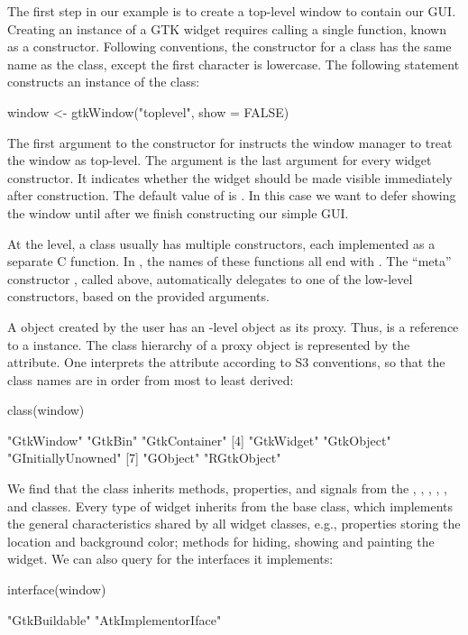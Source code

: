 The first step in our example is to create a top-level window to
contain our GUI.  Creating an instance of a GTK\/ widget requires
calling a single \R\/ function, known as a constructor. Following \R\/
conventions, the constructor for a class has the same name as the
class, except the first character is lowercase. The following
statement constructs an instance of the  class:
\begin{Schunk}
\begin{Sinput}
 window <- gtkWindow("toplevel", show = FALSE)
\end{Sinput}
\end{Schunk}
%
The first argument to the constructor for  instructs
the window manager to treat the window as top-level.  The 
argument is the last argument for every widget constructor. It
indicates whether the widget should be made visible immediately after
construction.  The default value of  is . In
this case we want to defer showing the window until after we finish
constructing our simple GUI.

At the \GTK\/ level, a class usually has multiple constructors, each
implemented as a separate C function. In , the names of
these functions all end with . The ``meta'' constructor
, called above, automatically delegates to one of
the low-level constructors, based on the provided arguments.

A \GTK\/ object created by the \R\/ user has an \R-level object as its
proxy. Thus,  is a reference to a 
instance.  The class hierarchy of a proxy object is represented by the
 attribute. One interprets the attribute according to S3
conventions, so that the class names are in order from most to least
derived:
\begin{Schunk}
\begin{Sinput}
 class(window)
\end{Sinput}
\begin{Soutput}
[1] "GtkWindow"         "GtkBin"            "GtkContainer"     
[4] "GtkWidget"         "GtkObject"         "GInitiallyUnowned"
[7] "GObject"           "RGtkObject"       
\end{Soutput}
\end{Schunk}
%
We find that the  class inherits methods,
properties, and signals from the , ,
, , , and
 classes. Every type of  widget inherits from
the base  class, which implements the general
characteristics shared by all widget classes, e.g., properties storing
the location and background color; methods for hiding, showing and
painting the widget. We can also query  for the
interfaces it implements:
\begin{Schunk}
\begin{Sinput}
 interface(window)
\end{Sinput}
\begin{Soutput}
[1] "GtkBuildable"        "AtkImplementorIface"
\end{Soutput}
\end{Schunk}

